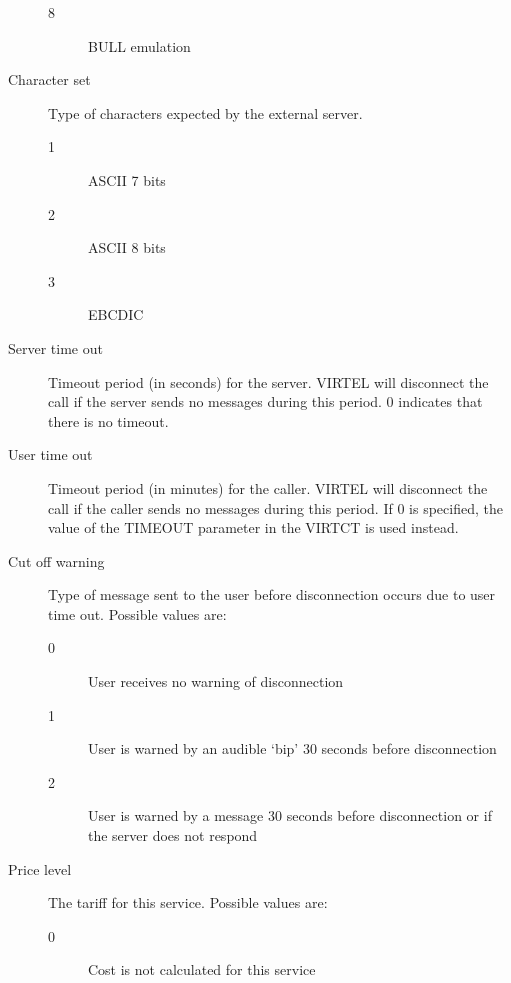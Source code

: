 \documentclass[letterpaper,10pt,english]{sphinxmanual}
\begin{document}
\begin{description}
\begin{description}
\item[{8}] \leavevmode
BULL emulation

\end{description}

\item[{Character set}] \leavevmode
Type of characters expected by the external server.
\begin{description}
\item[{1}] \leavevmode
ASCII 7 bits

\item[{2}] \leavevmode
ASCII 8 bits

\item[{3}] \leavevmode
EBCDIC

\end{description}

\item[{Server time out}] \leavevmode
Timeout period (in seconds) for the server. VIRTEL will disconnect the call if the server sends no messages during this period. 0 indicates that there is no timeout.

\item[{User time out}] \leavevmode
Timeout period (in minutes) for the caller. VIRTEL will disconnect the call if the caller sends no messages during this period. If 0 is specified, the value of the TIMEOUT parameter in the VIRTCT is used instead.

\item[{Cut off warning}] \leavevmode
Type of message sent to the user before disconnection occurs due to user time out. Possible values are:
\begin{description}
\item[{0}] \leavevmode
User receives no warning of disconnection

\item[{1}] \leavevmode
User is warned by an audible ‘bip’ 30 seconds before disconnection

\item[{2}] \leavevmode
User is warned by a message 30 seconds before disconnection or if the server does not respond

\end{description}

\item[{Price level}] \leavevmode
The tariff for this service. Possible values are:
\begin{description}
\item[{0}] \leavevmode
Cost is not calculated for this service


\end{description}
\end{description}
\end{document}
